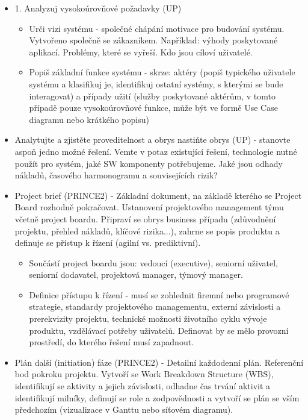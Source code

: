 \documentclass[11pt,a4paper]{article}
\begin{document}
        \begin{itemize}
            \item 1. Analyzuj vysokoúrovňové požadavky (UP)
            \begin{itemize}
                \item Urči vizi systému - společné chápání motivace pro budování systému. Vytvořeno společně se zákazníkem. Například: výhody poskytované aplikací. Problémy, které se vyřeší. Kdo jsou cíloví uživatelé.
                \item Popiš základní funkce systému - skrze: aktéry (popiš typického uživatele systému a klasifikuj je, identifikuj ostatní systémy, s kterými se bude interagovat) a případy užití (služby poskytované aktérům, v tomto případě pouze vysokoúrovňové funkce, může být ve formě Use Case diagramu nebo krátkého popisu)
            \end{itemize}
            \item Analytujte a zjistěte proveditelnost a obrys nastiňte obrys (UP) - stanovte aspoň jedno možné řešení. Vemte v potaz existující řešení, technologie nutné použít pro systém, jaké SW komponenty potřebujeme. Jaké jsou odhady nákladů, časového harmonogramu a souvisejících rizik?
            \item Project brief (PRINCE2) - Základní dokument, na základě kterého se Project Board rozhodně pokračovat. Ustanovení projektového management týmu včetně project boardu. Připraví se obrys business případu (zdůvodnění projektu, přehled nákladů, klíčové rizika...), zahrne se popis produktu a definuje se přístup k řízení (agilní vs. prediktivní).
            \begin{itemize}
                \item Součástí project boardu jsou: vedoucí (executive), seniorní uživatel, seniorní dodavatel, projektová manager, týmový manager.
                \item Definice přístupu k řízení - musí se zohlednit firemní nebo programové strategie, standardy projektového managementu, externí závislosti a prerekvizity projektu, technické možnosti životního cyklu vývoje produktu, vzdělávací potřeby uživatelů. Definovat by se mělo provozní prostředí, do kterého řešení musí zapadnout.
            \end{itemize}
            \item Plán další (initiation) fáze (PRINCE2) - Detailní každodenní plán. Referenční bod pokroku projektu. Vytvoří se Work Breakdown Structure (WBS), identifikují se aktivity a jejich závislosti, odhadne čas trvání aktivit a identifikují milníky, definují se role a zodpovědnosti a vytvoří se plán se vším předchozím (vizualizace v Ganttu nebo síťovém diagramu).
        \end{itemize}
\end{document}
